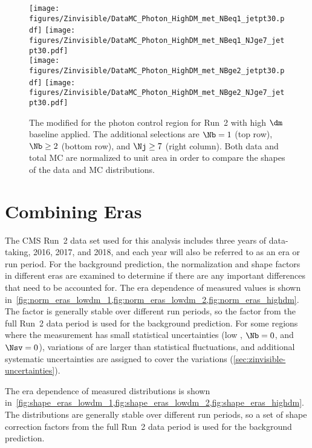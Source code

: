 \begin{figure}[tbp]
{
\centering
\texttt{[image: figures/Zinvisible/DataMC\_Photon\_HighDM\_met\_NBeq1\_jetpt30.pdf]}
\texttt{[image: figures/Zinvisible/DataMC\_Photon\_HighDM\_met\_NBeq1\_NJge7\_jetpt30.pdf]}\\
\texttt{[image: figures/Zinvisible/DataMC\_Photon\_HighDM\_met\_NBge2\_jetpt30.pdf]}
\texttt{[image: figures/Zinvisible/DataMC\_Photon\_HighDM\_met\_NBge2\_NJge7\_jetpt30.pdf]}\\
\caption[The modified \metphoton for the photon control region for Run~2 with high $\dm$ baseline applied]
{
    The modified \metphoton for the photon control region for Run~2 with high $\dm$ baseline applied.
    The additional selections are $\Nb=1$ (top row), $\Nb\geq2$ (bottom row), and $\Nj\geq7$ (right column).
    Both data and total MC are normalized to unit area in order to compare the shapes of the data and MC \metphoton distributions.
}
\label{fig:photon_met_highdm}
}
\end{figure}

\section{Combining Eras}
\label{sec:zinvisible-combining}

The CMS Run~2 data set used for this analysis includes three years of data-taking, 2016, 2017, and 2018, and each year will also be referred to as an era or run period.
For the \zinv background prediction, the normalization and shape factors in different eras are examined to determine if there are any important differences that need to be accounted for.
The era dependence of measured \Rz values is shown in~\cref{fig:norm_eras_lowdm_1,fig:norm_eras_lowdm_2,fig:norm_eras_highdm}.
The \Rz factor is generally stable over different run periods, so the \Rz factor from the full Run~2 data period is used for the background prediction.
For some regions where the measurement has small statistical uncertainties (\eg low \dm, $\Nb=0$, and $\Nsv=0$),
variations of \Rz are larger than statistical fluctuations, and additional systematic uncertainties are assigned to cover the variations (\cref{sec:zinvisible-uncertainties}).

The era dependence of measured \Sg distributions is shown in~\cref{fig:shape_eras_lowdm_1,fig:shape_eras_lowdm_2,fig:shape_eras_highdm}.
The distributions are generally stable over different run periods, so a set of \Sg shape correction factors from the full Run~2 data period is used for the background prediction.

